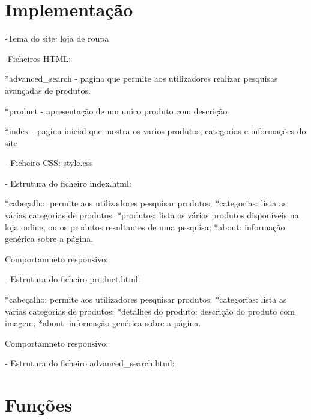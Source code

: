 \documentclass[11pt]{article}   %
\begin{document}
\section{Implementação}

\hspace{0,5cm}

-Tema do site: loja de roupa

-Ficheiros HTML:

    *advanced_search - pagina que permite aos utilizadores realizar pesquisas avançadas de produtos.

    *product - apresentação de um unico produto com descrição
    
    *index - pagina inicial que mostra os varios produtos, categorias e informações do site

- Ficheiro CSS: style.css

- Estrutura do ficheiro index.html:

    *cabeçalho: permite aos utilizadores pesquisar produtos;
    *categorias: lista as várias categorias de produtos;
    *produtos: lista os vários produtos disponíveis na loja online, ou os produtos resultantes de uma pesquisa;
    *about: informação genérica sobre a página.

    Comportamneto responsivo:

- Estrutura do ficheiro product.html:

    *cabeçalho: permite aos utilizadores pesquisar produtos;
    *categorias: lista as várias categorias de produtos;
    *detalhes do produto: descrição do produto com imagem;
    *about: informação genérica sobre a página.

    Comportamneto responsivo:

- Estrutura do ficheiro advanced_search.html:

\section{Funções}
    
\end{document}
